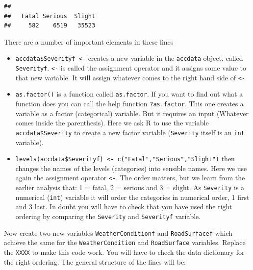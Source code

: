 \documentclass[
]{article}
\newenvironment{Shaded}{\begin{snugshade}}{\end{snugshade}}
\newcommand{\FunctionTok}[1]{\textcolor[rgb]{0.13,0.29,0.53}{\textbf{#1}}}
\newcommand{\NormalTok}[1]{#1}
\newcommand{\OtherTok}[1]{\textcolor[rgb]{0.56,0.35,0.01}{#1}}
\newcommand{\SpecialCharTok}[1]{\textcolor[rgb]{0.81,0.36,0.00}{\textbf{#1}}}
\providecommand{\tightlist}{%
  \setlength{\itemsep}{0pt}\setlength{\parskip}{0pt}}
\begin{document}
\begin{verbatim}
## 
##   Fatal Serious  Slight 
##     582    6519   35523
\end{verbatim}

There are a number of important elements in these lines

\begin{itemize}
\tightlist
\item
  \texttt{accdata\$Severityf\ \textless{}-} creates a new variable in
  the \texttt{accdata} object, called \texttt{Severityf}.
  \texttt{\textless{}-} is called the assignment operator and it assigns
  some value to that new variable. It will assign whatever comes to the
  right hand side of \texttt{\textless{}-}
\item
  \texttt{as.factor()} is a function called \texttt{as.factor}. If you
  want to find out what a function does you can call the help function
  \texttt{?as.factor}. This one creates a variable as a factor
  (categorical) variable. But it requires an input (Whatever comes
  inside the parenthesis). Here we ask R to use the variable
  \texttt{accdata\$Severity} to create a new factor variable
  (\texttt{Severity} itself is an \texttt{int} variable).
\item
  \texttt{levels(accdata\$Severityf)\ \textless{}-\ c("Fatal","Serious","Slight")}
  then changes the names of the levels (categories) into sensible names.
  Here we use again the assignment operator \texttt{\textless{}-}. The
  order matters, but we learn from the earlier analysis that: 1 = fatal,
  2 = serious and 3 = slight. As \texttt{Severity} is a numerical
  (\texttt{int}) variable it will order the categories in numerical
  order, 1 first and 3 last. In doubt you will have to check that you
  have used the right ordering by comparing the \texttt{Severity} and
  \texttt{Severityf} variable.
\end{itemize}

Now create two new variables \texttt{WeatherConditionf} and
\texttt{RoadSurfacef} which achieve the same for the
\texttt{WeatherCondition} and \texttt{RoadSurface} variables. Replace
the \texttt{XXXX} to make this code work. You will have to check the
data dictionary for the right ordering. The general structure of the
lines will be:

\begin{Shaded}
\end{Shaded}
\end{document}
